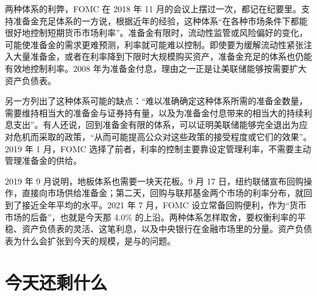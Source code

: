 两种体系的利弊，FOMC 在 2018 年 11 月的会议上摆过一次，都记在纪要里\cite{fomc2018nov}。支持准备金充足体系的一方说，根据近年的经验，这种体系“在各种市场条件下都能很好地控制短期货币市场利率”。准备金有限时，流动性监管或风险偏好的变化，可能使准备金的需求更难预测，利率就可能难以控制。即使要为缓解流动性紧张注入大量准备金，或者在利率降到下限时大规模购买资产，准备金充足的体系也仍能有效地控制利率。2008 年为准备金付息，理由之一正是让美联储能够按需要扩大资产负债表\cite{fed2008ior}。

另一方列出了这种体系可能的缺点：“难以准确确定这种体系所需的准备金数量，需要维持相当大的准备金与证券持有量，以及为准备金付息带来的相当大的持续利息支出”。有人还说，回到准备金有限的体系，可以证明美联储能够完全退出为应对危机而采取的政策，“从而可能提高公众对这些政策的接受程度或它们的效果”\cite{fomc2018nov}。2019 年 1 月，FOMC 选择了前者，利率的控制主要靠设定管理利率，不需要主动管理准备金的供给\cite{fomc2019ample}。

2019 年 9 月说明，地板体系也需要一块天花板。9 月 17 日，纽约联储宣布回购操作，直接向市场供给准备金；第二天，回购与联邦基金两个市场的利率分布，就回到了接近全年平均的水平\cite{anbil2020}。2021 年 7 月，FOMC 设立常备回购便利，作为“货币市场的后备”\cite{fomc2021srf}，也就是今天那 4.0\% 的上沿。两种体系怎样取舍，要权衡利率的平稳、资产负债表的灵活、这笔利息，以及中央银行在金融市场里的分量。资产负债表为什么会扩张到今天的规模，是与的问题。

\section{今天还剩什么}\label{sec:money-legacy}

